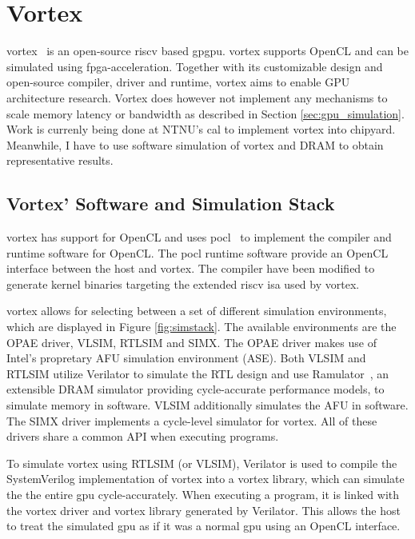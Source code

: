 \section{Vortex}

\Gls{vortex}~\cite{vortex} is an open-source \gls{riscv} based \acrshort{gpgpu}. \Gls{vortex} supports OpenCL and can be simulated using \acrshort{fpga}-acceleration. Together with its customizable design and open-source compiler, driver and runtime, \Gls{vortex} aims to enable GPU architecture research. Vortex does however  not implement any mechanisms to scale memory latency or bandwidth as described in Section \ref{sec:gpu_simulation}. Work is currenly being done at NTNU's \acrfull{cal} to implement \Gls{vortex} into chipyard. Meanwhile, I have to use software simulation of \Gls{vortex} and DRAM to obtain representative results.

\subsection{Vortex' Software and Simulation Stack}

\Gls{vortex} has support for OpenCL and uses \Gls{pocl}~\cite{pocl} to implement the compiler and runtime software for OpenCL. The \gls{pocl} runtime software provide an OpenCL interface between the host and \Gls{vortex}. The compiler have been modified to generate kernel binaries targeting the extended \gls{riscv} \acrshort{isa} used by \Gls{vortex}.

\Gls{vortex} allows for selecting between a set of different simulation environments, which are displayed in Figure \ref{fig:simstack}. The available environments are the OPAE driver, VLSIM, RTLSIM and SIMX. The OPAE driver makes use of Intel's propretary AFU simulation environment (ASE). Both VLSIM and RTLSIM utilize Verilator to simulate the RTL design and use Ramulator~\cite{Ramulator}, an extensible DRAM simulator providing cycle-accurate performance models, to simulate memory in software. VLSIM additionally simulates the AFU in software. The SIMX driver implements a cycle-level simulator for \Gls{vortex}. All of these drivers share a common API when executing programs. 

To simulate \Gls{vortex} using RTLSIM (or VLSIM), Verilator\cite{verilator} is used to compile the SystemVerilog implementation of \Gls{vortex} into a vortex library, which can simulate the the entire \acrshort{gpu} cycle-accurately. When executing a program, it is linked with the \Gls{vortex} driver and \Gls{vortex} library generated by Verilator. This allows the host to treat the simulated \acrshort{gpu} as if it was a normal \acrshort{gpu} using an OpenCL interface.

